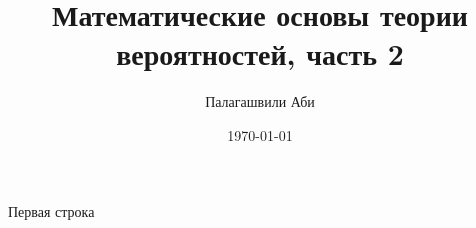 \documentclass[a4paper,12pt]{article}
\author{Палагашвили Аби}
\title{Математические основы теории вероятностей, часть 2}
\date{\today}
\begin{document}
\maketitle

Первая строка
\end{document}
